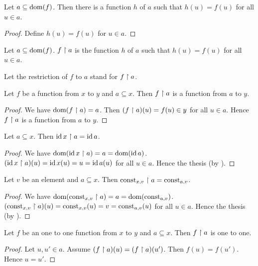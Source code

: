 \documentclass[../../set-theory.ftl.tex]{subfiles}
\begin{document}
  \begin{forthel}
    \begin{lemma}
      Let $a \subseteq \operatorname{dom}(f)$.
      Then there is a function $h$ of $a$ such that $h(u) = f(u)$ for all $u \in a$.
    \end{lemma}
    \begin{proof}
      Define $h(u) = f(u)$ for $u \in a$.
    \end{proof}

    \begin{definition}
      Let $a \subseteq \operatorname{dom}(f)$.
      $f \upharpoonright a$ is the function $h$ of $a$ such that $h(u) = f(u)$ for all $u \in a$.
    \end{definition}

    Let the restriction of $f$ to $a$ stand for $f \upharpoonright a$.

    \begin{proposition}\label{SetTheory_02_01_589280}
      Let $f$ be a function from $x$ to $y$ and $a \subseteq x$.
      Then $f \upharpoonright a$ is a function from $a$ to $y$.
    \end{proposition}
    \begin{proof}
      We have $\operatorname{dom}(f \upharpoonright a) = a$.
      Then $(f \upharpoonright a)(u) = f(u) \in y$ for all $u \in a$.
      Hence $f \upharpoonright a$ is a function from $a$ to $y$.
    \end{proof}

    \begin{proposition}\label{SetTheory_02_01_795968}
      Let $a \subseteq x$.
      Then $\operatorname{id}{x} \upharpoonright a = \operatorname{id}{a}$.
    \end{proposition}
    \begin{proof}
      We have $\operatorname{dom}(\operatorname{id}{x} \upharpoonright a) = a = \operatorname{dom}(\operatorname{id}{a})$.
      $(\operatorname{id}{x} \upharpoonright a)(u) = \operatorname{id}{x}(u) = u = \operatorname{id}{a}(u)$ for all $u \in a$.
      Hence the thesis (by ).
    \end{proof}

    \begin{proposition}\label{SetTheory_02_01_575265}
      Let $v$ be an element and $a \subseteq x$.
      Then $\mbox{const}_{x,v} \upharpoonright a = \mbox{const}_{a,v}$.
    \end{proposition}
    \begin{proof}
      We have $\operatorname{dom}(\mbox{const}_{x,v} \upharpoonright a) = a = \operatorname{dom}(\mbox{const}_{a,v})$.
      $(\mbox{const}_{x,v} \upharpoonright a)(u) = \mbox{const}_{x,v}(u) = v = \mbox{const}_{a,v}(u)$ for all $u \in a$.
      Hence the thesis (by ).
    \end{proof}

    \begin{proposition}\label{SetTheory_02_01_507691}
      Let $f$ be an one to one function from $x$ to $y$ and $a \subseteq x$.
      Then $f \upharpoonright a$ is one to one.
    \end{proposition}
    \begin{proof}
      Let $u,u' \in a$.
      Assume $(f \upharpoonright a)(u) = (f \upharpoonright a)(u')$.
      Then $f(u) = f(u')$.
      Hence $u = u'$.
    \end{proof}
  \end{forthel}
\end{document}

